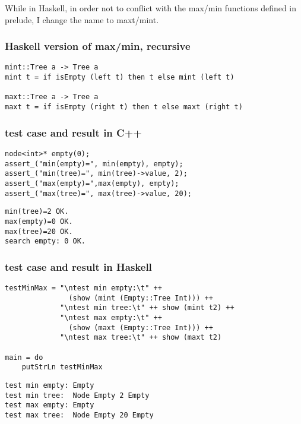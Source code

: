 \documentclass{article}
\begin{document}
While in Haskell, in order not to conflict with the max/min functions 
defined in prelude, I change the name to maxt/mint.

\subsubsection*{Haskell version of max/min, recursive}
\lstset{language=Haskell}
\begin{lstlisting}
mint::Tree a -> Tree a
mint t = if isEmpty (left t) then t else mint (left t)

maxt::Tree a -> Tree a
maxt t = if isEmpty (right t) then t else maxt (right t)
\end{lstlisting}

\subsubsection*{test case and result in C++}
\lstset{language=c++}
\begin{lstlisting}
node<int>* empty(0);
assert_("min(empty)=", min(empty), empty);
assert_("min(tree)=", min(tree)->value, 2);
assert_("max(empty)=",max(empty), empty);
assert_("max(tree)=", max(tree)->value, 20);
\end{lstlisting}

\begin{verbatim}
min(tree)=2 OK.
max(empty)=0 OK.
max(tree)=20 OK.
search empty: 0 OK.
\end{verbatim}

\subsubsection*{test case and result in Haskell}

\lstset{language=Haskell}
\begin{lstlisting}
testMinMax = "\ntest min empty:\t" ++ 
               (show (mint (Empty::Tree Int))) ++
             "\ntest min tree:\t" ++ show (mint t2) ++ 
             "\ntest max empty:\t" ++ 
               (show (maxt (Empty::Tree Int))) ++
             "\ntest max tree:\t" ++ show (maxt t2)

main = do
    putStrLn testMinMax
\end{lstlisting}

\begin{verbatim}
test min empty: Empty
test min tree:  Node Empty 2 Empty
test max empty: Empty
test max tree:  Node Empty 20 Empty
\end{verbatim}
\end{document}
